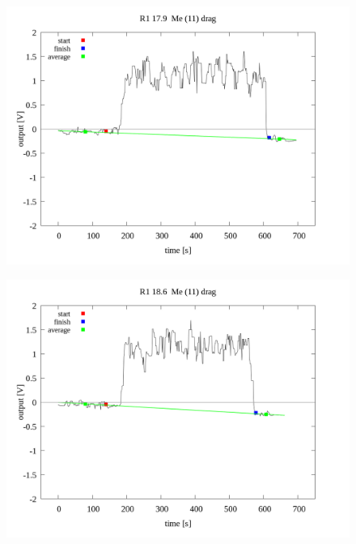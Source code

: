 \documentclass[a4paper]{jsarticle}
\begin{document}
\begin{figure}[htbp]
    \footnotesize
    \begin{center}
        \includegraphics[width=140mm]{../../../../33_result/210806/median/11/drag/03/R1_17.9_me(11)_drag_03.png}
    \end{center}
\end{figure}

\begin{figure}[htbp]
    \footnotesize
    \begin{center}
        \includegraphics[width=140mm]{../../../../33_result/210806/median/11/drag/03/R1_18.6_me(11)_drag_03.png}
    \end{center}
\end{figure}
\end{document}
